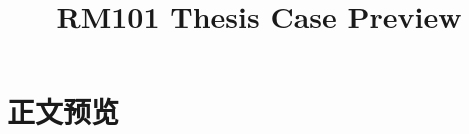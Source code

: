 \documentclass[UTF8]{ctexart}
\title{RM101 Thesis Case Preview}
\author{}
\date{}
\begin{document}
\maketitle
\tableofcontents
\clearpage

\section{正文预览}


\clearpage
\appendix

\end{document}
